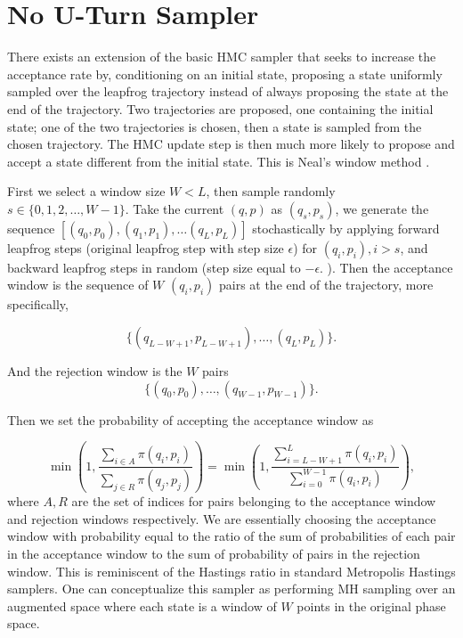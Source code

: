 \documentclass[12pt]{report}
\begin{document}
\section{No U-Turn Sampler}


There exists an extension of the basic HMC sampler that seeks to increase the acceptance
rate by, conditioning on an initial state, proposing a state uniformly sampled over the leapfrog trajectory instead of always proposing the state at the end
of the trajectory. Two trajectories are proposed, one containing the initial state; one
of the two trajectories is chosen, then a state is sampled from the chosen
trajectory. The HMC update step is then much more likely to propose and accept
a state different from the initial state. This is Neal's window
method \cite{neal1992improved}. 

First we select a window size $W < L$, then sample randomly $s \in \{0, 1,2 , \dots , W -1 \}$. Take the current $(q,p)$ as $(q_s, p_s)$, we generate the sequence $[(q_0,p_0),(q_1, p_1), \dots (q_L,p_L)]$ stochastically by applying forward leapfrog steps (original leapfrog step with step size $\epsilon$) for $(q_i,p_i), i > s $, and backward leapfrog steps in random (step size equal to $-\epsilon$. ). 
Then the acceptance window is the sequence of $W$ $(q_i,p_i)$ pairs at the end of the trajectory, more specifically,

\[ \{(q_{L-W+1},p_{L-W+1}), \dots , (q_L,p_L)\}.\]

And the rejection window is the $W$ pairs 
\[ \{(q_0,p_0), \dots, (q_{W-1},p_{W-1})\}. \]

Then we set the probability of accepting the acceptance window as 

\[ \min (1, \frac{\sum_{i\in A} \pi(q_i,p_i)}{\sum_{j \in R} \pi(q_j,p_j) }) = \min (1, \frac{\sum_{i=L-W+1}^L \pi(q_i,p_i)}{\sum_{i=0}^{W-1}\pi(q_i,p_i)}), \]
where $A,R$ are the set of indices for pairs belonging to the acceptance window and rejection windows respectively. We are essentially choosing the acceptance window with probability equal to the ratio of the sum of probabilities of each pair in the acceptance window to the sum of probability of pairs in the rejection window. This is reminiscent of the Hastings ratio in standard Metropolis Hastings samplers. One can conceptualize this sampler as performing MH sampling over an augmented space where each state is a window of $W$ points in the original phase space.
\end{document}
